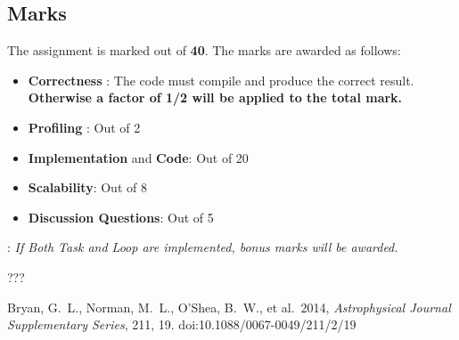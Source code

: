 \documentclass[11pt]{amsart}
\begin{document}
\subsection*{Marks\nopunct\\}\label{sec:handin:marks}
\noindent The assignment is marked out of \textbf{40}. The marks are awarded as follows:
\begin{itemize}
  \item{\textbf{Correctness} : The code must compile and produce the correct result. \textbf{Otherwise a factor of 1/2 will be applied to the total mark.}}
  \item{\textbf{Profiling} : Out of 2}
  \item{\textbf{Implementation} and \textbf{Code}: Out of 20}
  \item{\textbf{Scalability}: Out of 8}
  \item{\textbf{Discussion Questions}: Out of 5}
\end{itemize}

: \textit{If Both Task and Loop are implemented, bonus marks will be awarded.}


???

\begin{thebibliography}{2}

 Bryan, G.~L., Norman, M.~L., O'Shea, B.~W., et al.\ 2014, \textit{Astrophysical Journal Supplementary Series}, 211, 19. doi:10.1088/0067-0049/211/2/19

\end{thebibliography}
\end{document}
